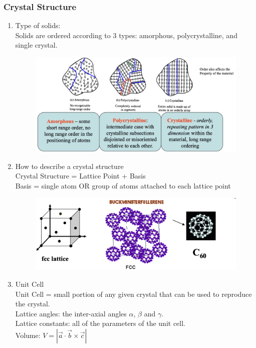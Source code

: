 \documentclass{article}
\begin{document}
\subsubsection{Crystal Structure}
\begin{enumerate}
    \item Type of solids: \\
    Solids are ordered according to 3 types: amorphous, polycrystalline, and single crystal.
    \begin{figure}[h]
        \centering
        \includegraphics[width=0.75\linewidth]{image/crstal.png}
    \end{figure}
    \item How to describe a crystal structure\\
    Crystal Structure = Lattice Point + Basis \\
    Basis = single atom OR group of atoms attached to each lattice point \\
    \begin{figure}[h]
        \centering
        \includegraphics[width=0.8\linewidth]{image/latticestructure.png}
    \end{figure}
    \item Unit Cell \\
    Unit Cell = small portion of any given crystal that can be used to reproduce the crystal. \\
    Lattice angles: the inter-axial angles $\alpha$, $\beta$ and $\gamma$. \\
    Lattice constants: all of the parameters of the unit cell. \\
    Volume: $\displaystyle V = |\Vec{a}\cdot\Vec{b}\times\Vec{c}|$

\end{enumerate}
\end{document}
